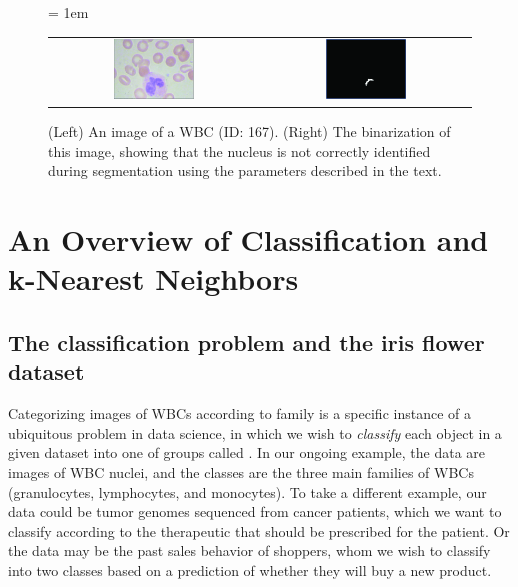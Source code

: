 \begin{figure}[h]
\centering
\tabcolsep = 1em
\mySfFamily
\begin{tabular}{c c}
\includegraphics[width = 0.4\textwidth]{../images_CMYK/WBC_167} & \includegraphics[width = 0.4\textwidth]{../images_CMYK/WBC_167_segmentation}
\end{tabular}
\caption{(Left) An image of a WBC (ID: 167). (Right) The binarization of this image, showing that the nucleus is not correctly identified during segmentation using the parameters described in the text.}
\label{fig:segmentation_imperfect}
\end{figure}





\FloatBarrier
{}
\section{An Overview of Classification and k-Nearest Neighbors}
\label{sec:knn}


\subsection{The classification problem and the iris flower dataset}

Categorizing images of WBCs according to family is a specific instance of a ubiquitous problem in data science, in which we wish to \textit{classify} each object in a given dataset into one of  groups called . In our ongoing example, the data are images of WBC nuclei, and the classes are the three main families of WBCs (granulocytes, lymphocytes, and monocytes). To take a different example, our data could be tumor genomes sequenced from cancer patients, which we want to classify according to the therapeutic that should be prescribed for the patient. Or the data may be the past sales behavior of shoppers, whom we wish to classify into two classes based on a prediction of whether they will buy a new product.

